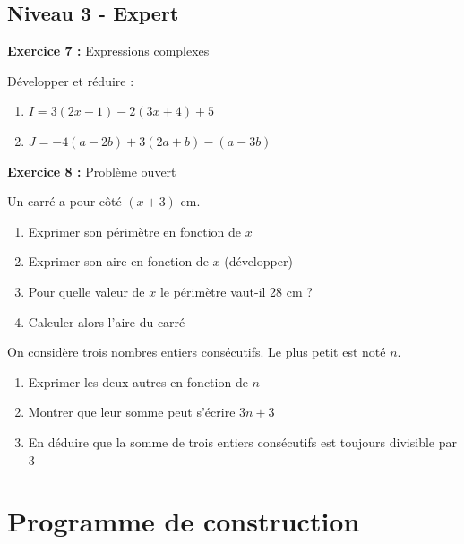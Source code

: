 \subsection{Niveau 3 - Expert}

\begin{exercisebox}
	\textbf{Exercice 7 :} Expressions complexes
	
	Développer et réduire :
	\begin{enumerate}[label=\alph*)]
		\item $I = 3(2x - 1) - 2(3x + 4) + 5$
		\item $J = -4(a - 2b) + 3(2a + b) - (a - 3b)$
	\end{enumerate}
	
	\textbf{Exercice 8 :} Problème ouvert
	
	Un carré a pour côté $(x + 3)$ cm.
	\begin{enumerate}
		\item Exprimer son périmètre en fonction de $x$
		\item Exprimer son aire en fonction de $x$ (développer)
		\item Pour quelle valeur de $x$ le périmètre vaut-il 28 cm ?
		\item Calculer alors l'aire du carré
	\end{enumerate}
\end{exercisebox}

\begin{exercisebox}
	On considère trois nombres entiers consécutifs. Le plus petit est noté $n$.
	\begin{enumerate}
		\item Exprimer les deux autres en fonction de $n$
		\item Montrer que leur somme peut s'écrire $3n + 3$
		\item En déduire que la somme de trois entiers consécutifs est toujours divisible par 3
	\end{enumerate}
\end{exercisebox}

\section{Programme de construction}

